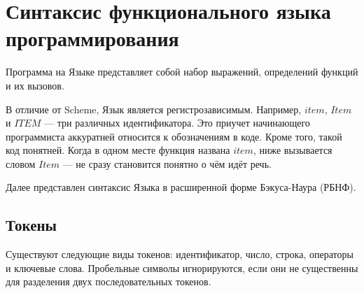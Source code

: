 \section{Синтаксис функционального языка программирования}
    Программа на Языке представляет собой набор выражений, определений функций и их вызовов.
    
    В отличие от Scheme, Язык является регистрозависимым.
    Например, $item$, $Item$ и $ITEM$ --- три различных идентификатора.
    Это приучет начинающего программиста аккуратней относится к обозначениям в коде.
    Кроме того, такой код понятней.
    Когда в одном месте функция названа $item$, ниже вызывается словом $Item$ --- не сразу становится понятно о чём идёт речь.

    Далее представлен синтаксис Языка в расширенной форме Бэкуса-Наура (РБНФ)\cite{skor}.

    \subsection{Токены}
        Существуют следующие виды токенов: идентификатор, число, строка, операторы и ключевые слова.
        Пробельные символы игнорируются, если они не существенны для разделения двух последовательных токенов.

